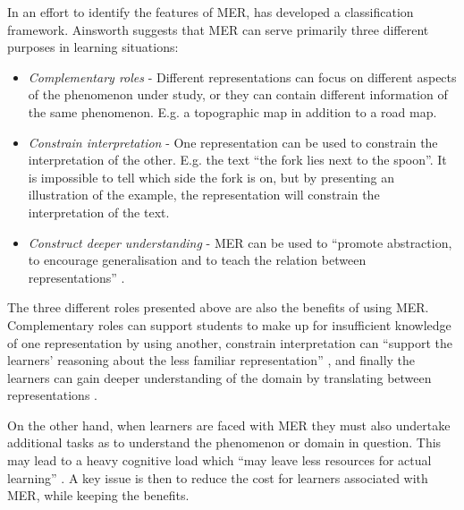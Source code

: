 In an effort to identify the features of MER, \citet{ainsworth1999functions} has developed a classification framework. Ainsworth suggests that MER can serve primarily three different purposes in learning situations:
\begin{itemize}
\item{} \emph{Complementary roles} - Different representations can focus on different aspects of the phenomenon under study, or they can contain different information of the same phenomenon. E.g. a topographic map in addition to a road map. 
\item{} \emph{Constrain interpretation} - One representation can be used to constrain the interpretation of the other. E.g. the text “the fork lies next to the spoon”. It is impossible to tell which side the fork is on, but by presenting an illustration of the example, the representation will constrain the interpretation of the text. 
\item{} \emph{Construct deeper understanding} - MER can be used to “promote abstraction, to encourage generalisation and to teach the relation between representations” \citep{ainsworth1999functions}. 
\end{itemize}

The three different roles presented above are also the benefits of using MER. Complementary roles can support students to make up for insufficient knowledge of one representation by using another, constrain interpretation can “support the learners’ reasoning about the less familiar representation” \citet{ainsworth1999functions}, and finally the learners can gain deeper understanding of the domain by translating between representations \citep{van2006supporting}. 

On the other hand, when learners are faced with MER they must also undertake additional tasks as to understand the phenomenon or domain in question. This may lead to a heavy cognitive load which “may leave less resources for actual learning” \citetext{Sweller, 1988, 1989, referenced in \citealp{van2006supporting}}. A key issue is then to reduce the cost for learners associated with MER, while keeping the benefits. 